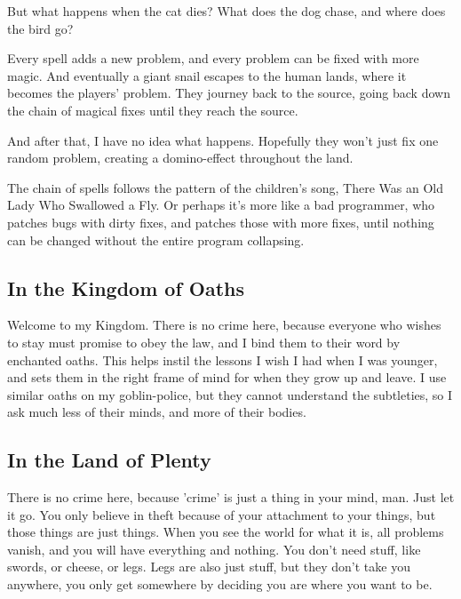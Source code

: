 But what happens when the cat dies?
What does the dog chase, and where does the bird go?

Every spell adds a new problem, and every problem can be fixed with more magic.
And eventually a giant snail escapes to the human lands, where it becomes the players' problem.
They journey back to the source, going back down the chain of magical fixes until they reach the source.

And after that, I have no idea what happens.
Hopefully they won't just fix one random problem, creating a domino-effect throughout the land.


The chain of spells follows the pattern of the children's song, There Was an Old Lady Who Swallowed a Fly.
Or perhaps it's more like a bad programmer, who patches bugs with dirty fixes, and patches those with more fixes, until nothing can be changed without the entire program collapsing.

\subsection{In the Kingdom of Oaths}

\begin{exampletext}
  Welcome to my Kingdom.
  There is no crime here, because everyone who wishes to stay must promise to obey the law, and I bind them to their word by enchanted oaths.
  This helps instil the lessons I wish I had when I was younger, and sets them in the right frame of mind for when they grow up and leave.
  I use similar oaths on my goblin-police, but they cannot understand the subtleties, so I ask much less of their minds, and more of their bodies.

\end{exampletext}

\subsection{In the Land of Plenty}

\begin{exampletext}
  There is no crime here, because 'crime' is just a thing in your mind, man.
  Just let it go.
  You only believe in theft because of your attachment to your things, but those things are just things.
  When you see the world for what it is, all problems vanish, and you will have everything and nothing.
  You don't need stuff, like swords, or cheese, or legs.
  Legs are also just stuff, but they don't take you anywhere, you only get somewhere by deciding you are where you want to be.
\end{exampletext}

